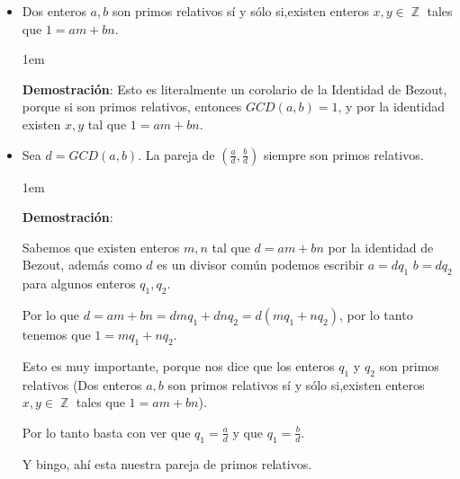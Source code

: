 \documentclass[12pt, fleqn]{report}                             %
\newenvironment{SmallIndentation}[1][0.75em]                    %
    {\begin{adjustwidth}{#1}{}\begin{footnotesize}}                 %
    {\end{footnotesize}\end{adjustwidth}}                           %
\DeclareMathOperator \Integers  {\mathbb{Z}}                     %
\begin{document}
            \begin{itemize}

                \item Dos enteros $a,b$ son primos relativos sí y sólo si,existen
                enteros $x,y \in \Integers$ tales que $1=am+bn$.

                    \begin{SmallIndentation}[1em]
                        \textbf{Demostración}:
                            Esto es literalmente un corolario de la Identidad de Bezout,
                            porque si son primos relativos, entonces $GCD(a,b)=1$, y por 
                            la identidad existen $x,y$ tal que $1=am+bn$.

                    \end{SmallIndentation} 


                \item Sea $d=GCD(a,b)$. La pareja de $(\frac{a}{d}, \frac{b}{d})$ siempre son
                primos relativos.

                    \begin{SmallIndentation}[1em]
                        \textbf{Demostración}:

                        Sabemos que existen enteros $m,n$ tal que $d = am+bn$ por la
                        identidad de Bezout, además como $d$ es un divisor común
                        podemos escribir $a=dq_1$ $b=dq_2$ para algunos enteros $q_1,q_2$.

                        Por lo que $d=am+bn = dmq_1 + dnq_2 = d(mq_1 +nq_2)$, por
                        lo tanto tenemos que $1= mq_1 + nq_2$.

                        Esto es muy importante, porque nos dice que los enteros $q_1$ y $q_2$
                        son primos relativos (Dos enteros $a,b$ son primos relativos sí y sólo
                        si,existen enteros $x,y \in \Integers$ tales que $1=am+bn$).

                        Por lo tanto basta con ver que $q_1=\frac{a}{d}$ y que $q_1=\frac{b}{d}$.

                        Y bingo, ahí esta nuestra pareja de primos relativos.

                    \end{SmallIndentation} 

            \end{itemize}
\end{document}
